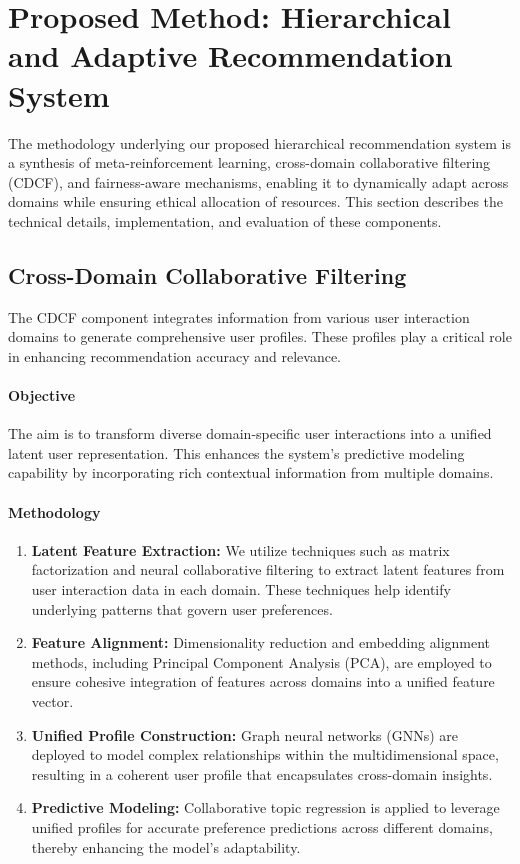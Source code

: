\documentclass{article} %
\begin{document}
\section{Proposed Method: Hierarchical and Adaptive Recommendation System}

The methodology underlying our proposed hierarchical recommendation system is a synthesis of meta-reinforcement learning, cross-domain collaborative filtering (CDCF), and fairness-aware mechanisms, enabling it to dynamically adapt across domains while ensuring ethical allocation of resources. This section describes the technical details, implementation, and evaluation of these components.

\subsection{Cross-Domain Collaborative Filtering}

The CDCF component integrates information from various user interaction domains to generate comprehensive user profiles. These profiles play a critical role in enhancing recommendation accuracy and relevance.

\paragraph{Objective}
The aim is to transform diverse domain-specific user interactions into a unified latent user representation. This enhances the system's predictive modeling capability by incorporating rich contextual information from multiple domains.

\paragraph{Methodology}
\begin{enumerate}
    \item \textbf{Latent Feature Extraction:} We utilize techniques such as matrix factorization and neural collaborative filtering to extract latent features from user interaction data in each domain. These techniques help identify underlying patterns that govern user preferences.
  
    \item \textbf{Feature Alignment:} Dimensionality reduction and embedding alignment methods, including Principal Component Analysis (PCA), are employed to ensure cohesive integration of features across domains into a unified feature vector.

    \item \textbf{Unified Profile Construction:} Graph neural networks (GNNs) are deployed to model complex relationships within the multidimensional space, resulting in a coherent user profile that encapsulates cross-domain insights.

    \item \textbf{Predictive Modeling:} Collaborative topic regression is applied to leverage unified profiles for accurate preference predictions across different domains, thereby enhancing the model's adaptability.
\end{enumerate}
\end{document}

